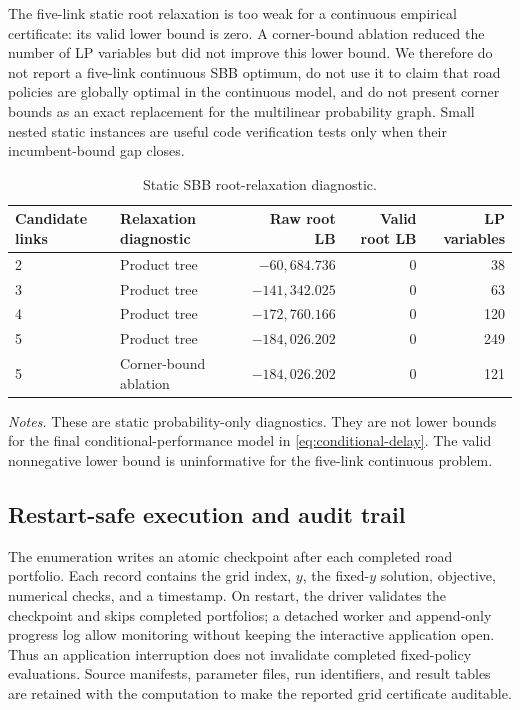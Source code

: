 The five-link static root relaxation is too weak for a continuous empirical
certificate: its valid lower bound is zero. A corner-bound ablation reduced
the number of LP variables but did not improve this lower bound. We
therefore do not report a five-link continuous SBB optimum, do not use it to
claim that road policies are globally optimal in the continuous model, and
do not present corner bounds as an exact replacement for the multilinear
probability graph. Small nested static instances are useful code
verification tests only when their incumbent-bound gap closes.

\begin{table}[t]
\centering
\caption{Static SBB root-relaxation diagnostic.}
\label{tab:sbb-root-diagnostic}
\small
\begin{tabular}{llrrr}
\toprule
Candidate links & Relaxation diagnostic & Raw root LB & Valid root LB & LP variables\\
\midrule
2 & Product tree & \(-60{,}684.736\) & 0 & 38\\
3 & Product tree & \(-141{,}342.025\) & 0 & 63\\
4 & Product tree & \(-172{,}760.166\) & 0 & 120\\
5 & Product tree & \(-184{,}026.202\) & 0 & 249\\
5 & Corner-bound ablation & \(-184{,}026.202\) & 0 & 121\\
\bottomrule
\end{tabular}
\par\smallskip
\footnotesize\textit{Notes.} These are static probability-only diagnostics.
They are not lower bounds for the final conditional-performance model in
\eqref{eq:conditional-delay}. The valid nonnegative lower bound is
uninformative for the five-link continuous problem.
\end{table}

\subsection{Restart-safe execution and audit trail}
\label{sec:computational-audit}

The enumeration writes an atomic checkpoint after each completed road
portfolio. Each record contains the grid index, \(y\), the fixed-\(y\)
solution, objective, numerical checks, and a timestamp. On restart, the
driver validates the checkpoint and skips completed portfolios; a detached
worker and append-only progress log allow monitoring without keeping the
interactive application open. Thus an application interruption does not
invalidate completed fixed-policy evaluations. Source manifests, parameter
files, run identifiers, and result tables are retained with the computation
to make the reported grid certificate auditable.


